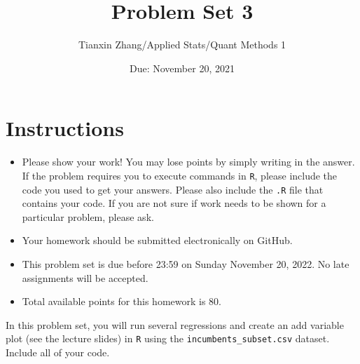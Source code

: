 \documentclass[12pt,letterpaper]{article}
\title{Problem Set 3}
\date{Due: November 20, 2021}
\author{Tianxin Zhang/Applied Stats/Quant Methods 1}
\begin{document}
	\maketitle
	\section*{Instructions}
	\begin{itemize}
		\item Please show your work! You may lose points by simply writing in the answer. If the problem requires you to execute commands in \texttt{R}, please include the code you used to get your answers. Please also include the \texttt{.R} file that contains your code. If you are not sure if work needs to be shown for a particular problem, please ask.
	\item Your homework should be submitted electronically on GitHub.
	\item This problem set is due before 23:59 on Sunday November 20, 2022. No late assignments will be accepted.
	\item Total available points for this homework is 80.
	\end{itemize}

		\vspace{.25cm}
	
\noindent In this problem set, you will run several regressions and create an add variable plot (see the lecture slides) in \texttt{R} using the \texttt{incumbents\_subset.csv} dataset. Include all of your code.

	\vspace{.5cm}
\end{document}

